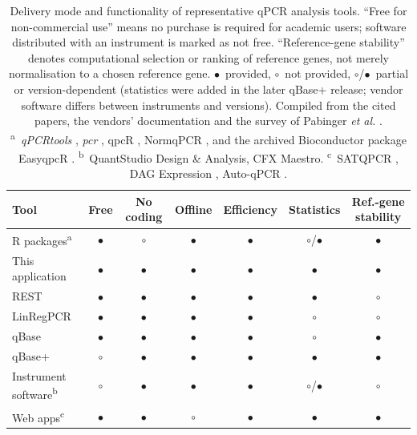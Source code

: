 \begin{table}[h]
\centering
\footnotesize
\setlength{\tabcolsep}{2pt}
\caption{Delivery mode and functionality of representative qPCR analysis
tools. ``Free for non-commercial use'' means no purchase is required for
academic users; software distributed with an instrument is marked as not
free. ``Reference-gene stability'' denotes computational selection or ranking
of reference genes, not merely normalisation to a chosen reference gene.
$\bullet$~provided, $\circ$~not provided, $\circ$/$\bullet$~partial or
version-dependent (statistics were added in the later qBase+ release; vendor
software differs between instruments and versions). Compiled from the cited
papers, the vendors' documentation and the survey of Pabinger \textit{et al.}
\cite{pabinger2014survey}. \textsuperscript{a}~\textit{qPCRtools}
\cite{li2022qpcrtools}, \textit{pcr} \cite{ahmed2018pcr}, qpcR
\cite{ritz2008qpcr}, NormqPCR \cite{perkins2012normqpcr}, and the archived
Bioconductor package EasyqpcR \cite{lepape2017easyqpcr}.
\textsuperscript{b}~QuantStudio Design \& Analysis, CFX Maestro.
\textsuperscript{c}~SATQPCR \cite{rancurel2019satqpcr}, DAG Expression
\cite{ballester2013dag}, Auto-qPCR \cite{maussion2021autoqpcr}.}
\label{tab:tools}
\begin{tabular}{lcccccc}
\toprule
Tool & Free & No coding & Offline & Efficiency & Statistics & Ref.-gene stability \\
\midrule
R packages\textsuperscript{a} & $\bullet$ & $\circ$ & $\bullet$ & $\bullet$ & $\circ$/$\bullet$ & $\bullet$ \\
This application & $\bullet$ & $\bullet$ & $\bullet$ & $\bullet$ & $\bullet$ & $\bullet$ \\
REST & $\bullet$ & $\bullet$ & $\bullet$ & $\bullet$ & $\bullet$ & $\circ$ \\
LinRegPCR & $\bullet$ & $\bullet$ & $\bullet$ & $\bullet$ & $\circ$ & $\circ$ \\
qBase & $\bullet$ & $\bullet$ & $\bullet$ & $\bullet$ & $\circ$ & $\bullet$ \\
qBase+ & $\circ$ & $\bullet$ & $\bullet$ & $\bullet$ & $\bullet$ & $\bullet$ \\
Instrument software\textsuperscript{b} & $\circ$ & $\bullet$ & $\bullet$ & $\bullet$ & $\circ$/$\bullet$ & $\circ$ \\
Web apps\textsuperscript{c} & $\bullet$ & $\bullet$ & $\circ$ & $\bullet$ & $\bullet$ & $\bullet$ \\
\bottomrule
\end{tabular}
\end{table}

